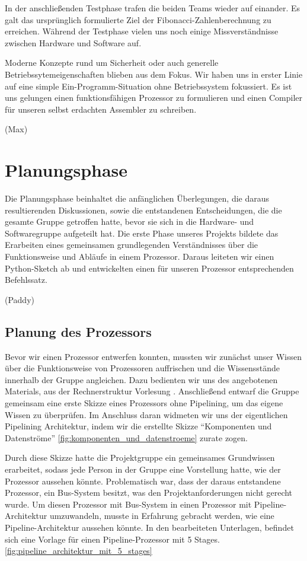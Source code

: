 \documentclass[paper=a4,fontsize=12pt,twocolumn]{scrreprt}
\begin{document}
In der anschließenden Testphase trafen die beiden Teams wieder auf einander.
Es galt das ursprünglich formulierte Ziel der Fibonacci-Zahlenberechnung zu erreichen.
Während der Testphase vielen uns noch einige Missverständnisse zwischen Hardware und Software auf.

Moderne Konzepte rund um Sicherheit oder auch generelle Betriebssytemeigenschaften blieben aus dem Fokus.
Wir haben uns in erster Linie auf eine simple Ein-Programm-Situation ohne Betriebssystem fokussiert.
Es ist uns gelungen einen funktionsfähigen Prozessor zu formulieren und einen Compiler für unseren selbst erdachten Assembler zu schreiben.

(Max)

\chapter{Planungsphase}
\label{ch:planungsphase}

Die Planungsphase beinhaltet die anfänglichen Überlegungen, die daraus resultierenden Diskussionen, sowie die entstandenen Entscheidungen, die die gesamte Gruppe getroffen hatte, bevor sie sich in die Hardware- und Softwaregruppe aufgeteilt hat.
Die erste Phase unseres Projekts bildete das Erarbeiten eines gemeinsamen grundlegenden Verständnisses über die Funktionsweise und Abläufe in einem Prozessor. 
Daraus leiteten wir einen Python-Sketch ab und entwickelten einen für unseren Prozessor entsprechenden Befehlssatz.     

(Paddy)

\section{Planung des Prozessors}
\label{sec:planung_des_prozessors}
Bevor wir einen Prozessor entwerfen konnten, mussten wir zunächst unser Wissen über die Funktionsweise von Prozessoren auffrischen und die Wissensstände innerhalb der Gruppe angleichen.
Dazu bedienten wir uns des angebotenen Materials, aus der Rechnerstruktur Vorlesung \textcite{rsvorlesung}.
Anschließend entwarf die Gruppe gemeinsam eine erste Skizze eines Prozessors ohne Pipelining, um das eigene Wissen zu überprüfen.
Im Anschluss daran widmeten wir uns der eigentlichen Pipelining Architektur, indem wir die erstellte Skizze \enquote{Komponenten und Datenströme} \ref{fig:komponenten_und_datenstroeme} zurate zogen.

Durch diese Skizze hatte die Projektgruppe ein gemeinsames Grundwissen erarbeitet, sodass jede Person in der Gruppe eine Vorstellung hatte, wie der Prozessor aussehen könnte.
Problematisch war, dass der daraus entstandene Prozessor, ein Bus-System besitzt, was den Projektanforderungen nicht gerecht wurde.
Um diesen Prozessor mit Bus-System in einen Prozessor mit Pipeline-Architektur umzuwandeln, musste in Erfahrung gebracht werden, wie eine Pipeline-Architektur aussehen könnte.
In den bearbeiteten Unterlagen, befindet sich eine Vorlage für einen Pipeline-Prozessor mit 5 Stages.\ref{fig:pipeline_architektur_mit_5_stages}
\end{document}
